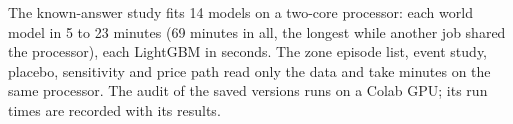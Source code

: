 The known-answer study fits 14 models on a two-core processor: each world model in 5 to 23 minutes (69 minutes in all, the longest while another job shared the processor), each LightGBM in seconds. The zone episode list, event study, placebo, sensitivity and price path read only the data and take minutes on the same processor. The audit of the saved versions runs on a Colab GPU; its run times are recorded with its results.
